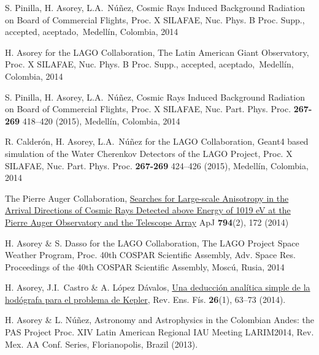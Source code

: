 \begin{etaremune}
\item {}S. Pinilla, H. Asorey, L.A.\ Núñez, {{Cosmic Rays Induced Background Radiation on Board of Commercial Flights}}, \en Proc.
X SILAFAE, Nuc.
Phys.
B Proc.
Supp., \ifeng accepted, \else aceptado,\fi\ Medellín, Colombia, 2014

\item {}H. Asorey for the LAGO Collaboration, {{The Latin American Giant Observatory}}, \en Proc.
X SILAFAE, Nuc.
Phys.
B Proc.
Supp., \ifeng accepted, \else aceptado,\fi\ Medellín, Colombia, 2014

\item {}S. Pinilla, H. Asorey, L.A.\ Núñez, {{Cosmic Rays Induced Background Radiation on Board of Commercial Flights}}, \en Proc.
X SILAFAE,  Nuc.
Part.
Phys.
Proc. {\textbf{267-269}} 418--420 (2015), Medellín, Colombia, 2014

\item {}R. Calderón, H. Asorey, L.A.\ Núñez for the LAGO Collaboration, {{Geant4 based simulation of the Water Cherenkov Detectors of the LAGO Project}}, \en Proc.
X SILAFAE, Nuc.
Part.
Phys.
Proc. {\textbf{267-269}} 424--426 (2015), Medellín, Colombia, 2014

\item {}The Pierre Auger Collaboration, \href{http://dx.doi.org/10.1088/0004-637X/794/2/172}{{Searches for Large-scale Anisotropy in the Arrival Directions of Cosmic Rays Detected above Energy of 1019 eV at the Pierre Auger Observatory and the Telescope Array}} ApJ {\textbf{794}}(2), 172 (2014)

\item {}H. Asorey \& S. Dasso for the LAGO Collaboration, {{The LAGO Project Space Weather Program}}, \en Proc. 40th COSPAR Scientific Assembly, Adv. Space Res. \in Proceedings of the 40th COSPAR Scientific Assembly, Moscú, Rusia, 2014

\item {}H. Asorey, J.I.\ Castro \& A. López Dávalos, \href{http://www.revistas.unc.edu.ar/index.php/revistaEF/article/view/9512}{{Una deducción analítica simple de la hodógrafa para el problema de Kepler}}, Rev. Ens. Fís. {\textbf{26}}(1), 63--73 (2014).

\item {}H. Asorey \& L. Núñez, {{Astronomy and Astrophysics in the Colombian Andes: the PAS Project}} \en Proc.
XIV Latin American Regional IAU Meeting LARIM2014, Rev. Mex. AA Conf. Series, Florianopolis, Brazil (2013).


\end{etaremune}
